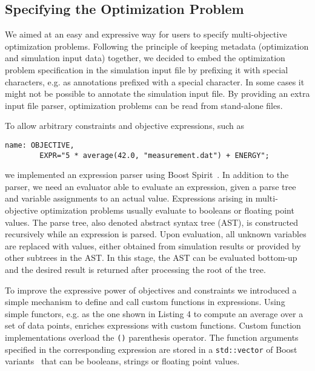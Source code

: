 \documentclass[%
reprint,
amsmath,amssymb,
aps,
prstab,
]{revtex4-1}
\begin{document}
\subsection{Specifying the Optimization Problem}

We aimed at an easy and expressive way for users to specify multi-objective
  optimization problems.
Following the principle of keeping metadata (optimization and simulation
  input data) together, we decided to embed the optimization problem
  specification in the simulation input file by prefixing it with special
  characters, e.g. as annotations prefixed with a special character.
In some cases it might not be possible to annotate the simulation input file.
By providing an extra input file parser, optimization problems can be read
  from stand-alone files.

To allow arbitrary constraints and objective expressions, such as
%
\begin{Verbatim}[fontsize=\scriptsize]
  name: OBJECTIVE,
        EXPR="5 * average(42.0, "measurement.dat") + ENERGY";
\end{Verbatim}
%
\noindent
  we implemented an expression parser using Boost Spirit~\cite{boost}.
In addition to the parser, we need an evaluator able to evaluate an expression,
  given a parse tree and variable assignments to an actual value.
Expressions arising in multi-objective optimization problems usually evaluate
  to booleans or floating point values.
The parse tree, also denoted abstract syntax tree (AST), is constructed
  recursively while an expression is parsed.
Upon evaluation, all unknown variables are replaced with values, either
  obtained from simulation results or provided by other subtrees in the AST.
In this stage, the AST can be evaluated bottom-up and the desired result is
  returned after processing the root of the tree.

To improve the expressive power of objectives and constraints we introduced a
  simple mechanism to define and call custom functions in expressions.
Using simple functors, e.g. as the one shown in Listing 4 to compute an
  average over a set of data points, enriches expressions with custom
  functions.
Custom function implementations overload the \texttt{()} parenthesis operator.
The function arguments specified in the corresponding expression are stored in
  a \texttt{std::vector} of Boost variants~\cite{boost2} that can be
  booleans, strings or floating point values.
\end{document}
